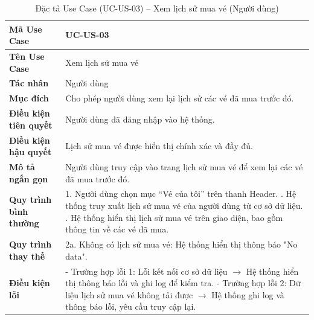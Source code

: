 \renewcommand{\arraystretch}{1.3}
\setlength{\tabcolsep}{4pt}
\begin{longtable}{|p{}|p{}|}
\caption{Đặc tả Use Case (UC-US-03) -- Xem lịch sử mua vé (Người dùng) }\label{tab:uc_view_ticket_history_user}\\
\hline
\textbf{Mã Use Case} & UC-US-03 \\ \hline
\textbf{Tên Use Case} & Xem lịch sử mua vé \\ \hline
\textbf{Tác nhân} & Người dùng \\ \hline
\textbf{Mục đích} & Cho phép người dùng xem lại lịch sử các vé đã mua trước đó. \\ \hline
\textbf{Điều kiện tiên quyết} & Người dùng đã đăng nhập vào hệ thống. \\ \hline
\textbf{Điều kiện hậu quyết} & Lịch sử mua vé được hiển thị chính xác và đầy đủ. \\ \hline
\textbf{Mô tả ngắn gọn} & Người dùng truy cập vào trang lịch sử mua vé để xem lại các vé đã mua trước đó. \\ \hline
\textbf{Quy trình bình thường} &
1. Người dùng chọn mục “Vé của tôi” trên thanh Header. \newline
2. Hệ thống truy xuất lịch sử mua vé của người dùng từ cơ sở dữ liệu. \newline
3. Hệ thống hiển thị lịch sử mua vé trên giao diện, bao gồm thông tin về các vé đã mua. \\ \hline
\textbf{Quy trình thay thế} &
2a. Không có lịch sử mua vé: Hệ thống hiển thị thông báo "No data". \\ \hline
\textbf{Điều kiện lỗi} &
- Trường hợp lỗi 1: Lỗi kết nối cơ sở dữ liệu $\rightarrow$ Hệ thống hiển thị thông báo lỗi và ghi log để kiểm tra. \newline
- Trường hợp lỗi 2: Dữ liệu lịch sử mua vé không tải được $\rightarrow$ Hệ thống ghi log và thông báo lỗi, yêu cầu truy cập lại. \\ \hline
\end{longtable}

